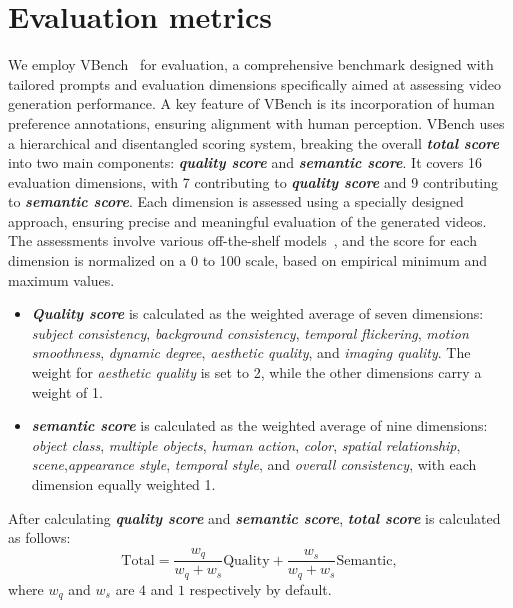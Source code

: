 \section{Evaluation metrics}
\label{appendix:vbench}
We employ VBench~\citep{huang2023vbench} for evaluation, a comprehensive benchmark designed with tailored prompts and evaluation dimensions specifically aimed at assessing video generation performance.
A key feature of VBench is its incorporation of human preference annotations, ensuring alignment with human perception.
VBench uses a hierarchical and disentangled scoring system, breaking the overall \textbf{\textit{total score}} into two main components: \textbf{\textit{quality score}} and \textbf{\textit{semantic score}}.
It covers 16 evaluation dimensions, with 7 contributing to \textbf{\textit{quality score}} and 9 contributing to \textbf{\textit{semantic score}}. 
Each dimension is assessed using a specially designed approach, ensuring precise and meaningful evaluation of the generated videos. The assessments involve various off-the-shelf models~\citep{caron2021dino, ruiz2023dreambooth, radford2021clip, li2023amt, teed2020raft, laion2022aesthetic,ke2021MUSIQ,wu2022GRiT, li2023umt,huang2023t2i-compbench,huang2024tagtext, wang2024internvid},  and the score for each dimension is normalized on a 0 to 100 scale, based on empirical minimum and maximum values.
\begin{itemize}
    \item \textbf{\textit{Quality score}} is calculated as the weighted average of seven dimensions: {\it subject consistency}, {\it background consistency}, {\it temporal flickering}, {\it motion smoothness}, {\it dynamic degree}, {\it aesthetic quality}, and {\it imaging quality}. The weight for {\it aesthetic quality} is set to 2, while the other dimensions carry a weight of 1. 
    \item \textbf{\textit{semantic score}} is calculated as the weighted average of nine dimensions: {\it object class}, {\it multiple objects}, {\it human action}, {\it color}, {\it spatial relationship}, {\it scene},{\it appearance style}, {\it temporal style}, and {\it overall consistency}, with each dimension equally weighted 1.
\end{itemize}
 
After calculating \textbf{\textit{quality score}} and \textbf{\textit{semantic score}}, \textbf{\textit{total score}} is calculated as follows:
\begin{equation}
    \mathrm{Total} = \frac{w_q}{w_q+w_s}\mathrm{Quality}+\frac{w_s}{w_q+w_s}\mathrm{Semantic},
\end{equation}
where $w_q$ and $w_s$ are $4$ and $1$ respectively by default.

